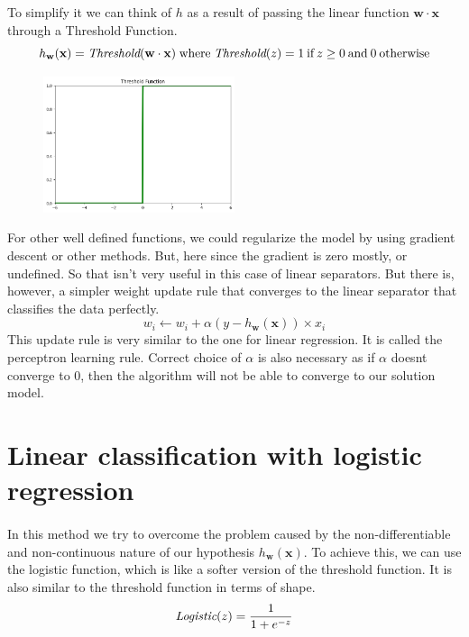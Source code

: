 \documentclass{article}
\begin{document}
    To simplify it we can think of $h$ as a result of passing the linear function $\mathbf{w} \cdot \mathbf{x}$ through a Threshold Function.
    \begin{equation*}
      h_{\mathbf{w}}(\mathbf{x}) = \emph{Threshold} (\mathbf{w} \cdot \mathbf{x}) \; \text{where} \;  \emph{Threshold}(z) = 1 \: \text{if} \:  z \geq 0 \: \text{and} \: 0 \: \text{otherwise}
    \end{equation*}

    \begin{figure}[H]
      \centering
      \includegraphics[width=0.5\textwidth]{plot1.png}
   \end{figure}

   For other well defined functions, we could regularize the model by using gradient descent or other methods. But, here since the gradient is zero mostly, or undefined. So that isn’t very useful in this case of linear separators. But there is, however, a simpler weight update rule that converges to the linear separator that classifies the data perfectly.
   \begin{equation*}
    w_i \leftarrow w_i + \alpha(y-h_{\mathbf{w}}(\mathbf{x})) \times x_i
   \end{equation*}
   This update rule is very similar to the one for linear regression. It is called the perceptron learning rule. Correct choice of $\alpha$ is also necessary as if $\alpha$ doesnt converge to 0, then the algorithm will not be able to converge to our solution model.

   \section*{Linear classification with logistic regression}
   \paragraph{}
    In this method we try to overcome the problem caused by the non-differentiable and non-continuous nature of our hypothesis $h_{\mathbf{w}}(\mathbf{x})$. To achieve this, we can use the logistic function, which is like a softer version of the threshold function. It is also similar to the threshold function in terms of shape.
    \begin{equation*}
      \emph{Logistic}(z) = \frac{1}{1 + e^{-z}}
    \end{equation*}
\end{document}
